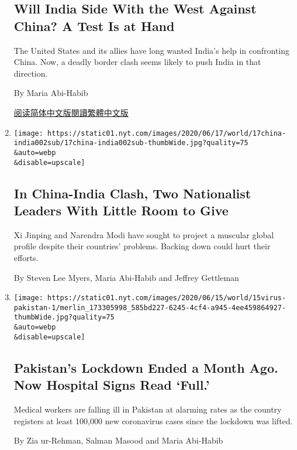 \begin{enumerate}
  \hypertarget{will-india-side-with-the-west-against-china-a-test-is-at-hand}{%
  \subsection{Will India Side With the West Against China? A Test Is at
  Hand}\label{will-india-side-with-the-west-against-china-a-test-is-at-hand}}

  The United States and its allies have long wanted India's help in
  confronting China. Now, a deadly border clash seems likely to push
  India in that direction.

  By Maria Abi-Habib

  \href{https://cn.nytimes.com/world/20200622/india-china-border/}{阅读简体中文版}\href{https://cn.nytimes.com/world/20200622/india-china-border/zh-hant/}{閱讀繁體中文版}
\item
  \href{/2020/06/17/world/asia/china-india-border.html}{}

  \texttt{[image: https://static01.nyt.com/images/2020/06/17/world/17china-india002sub/17china-india002sub-thumbWide.jpg?quality=75\\\&auto=webp\\\&disable=upscale]}

  \hypertarget{in-china-india-clash-two-nationalist-leaders-with-little-room-to-give}{%
  \subsection{In China-India Clash, Two Nationalist Leaders With Little
  Room to
  Give}\label{in-china-india-clash-two-nationalist-leaders-with-little-room-to-give}}

  Xi Jinping and Narendra Modi have sought to project a muscular global
  profile despite their countries' problems. Backing down could hurt
  their efforts.

  By Steven Lee Myers, Maria Abi-Habib and Jeffrey Gettleman
\item
  \href{/2020/06/15/world/asia/pakistan-coronavirus-hospitals.html}{}

  \texttt{[image: https://static01.nyt.com/images/2020/06/15/world/15virus-pakistan-1/merlin\_173305998\_585bd227-6245-4cf4-a945-4ee459864927-thumbWide.jpg?quality=75\\\&auto=webp\\\&disable=upscale]}

  \hypertarget{pakistans-lockdown-ended-a-month-ago-now-hospital-signs-read-full}{%
  \subsection{Pakistan's Lockdown Ended a Month Ago. Now Hospital Signs
  Read
  `Full.'}\label{pakistans-lockdown-ended-a-month-ago-now-hospital-signs-read-full}}

  Medical workers are falling ill in Pakistan at alarming rates as the
  country registers at least 100,000 new coronavirus cases since the
  lockdown was lifted.

  By Zia ur-Rehman, Salman Masood and Maria Abi-Habib
\end{enumerate}


